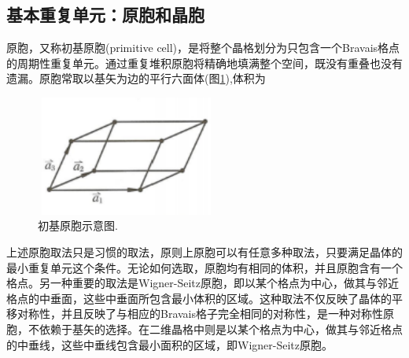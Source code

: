 \subsection{基本重复单元：原胞和晶胞}
原胞，又称初基原胞(primitive cell)，是将整个晶格划分为只包含一个Bravais格点的周期性重复单元。通过重复堆积原胞将精确地填满整个空间，既没有重叠也没有遗漏。原胞常取以基矢为边的平行六面体(图\ref{Fig:Primitive_Cell}),体积为
\begin{figure}[h!]
\centering
\vspace*{-0.05in}
\includegraphics[height=1.55in,width=2.35in,viewport=0 0 38 25,clip]{Figures/Primitive_cell.png}
\caption{\small \textrm{初基原胞示意图.}}%
\label{Fig:Primitive_Cell}
\end{figure}
上述原胞取法只是习惯的取法，原则上原胞可以有任意多种取法，只要满足晶体的最小重复单元这个条件。无论如何选取，原胞均有相同的体积，并且原胞含有一个格点。另一种重要的取法是Wigner-Seitz原胞，即以某个格点为中心，做其与邻近格点的中垂面，这些中垂面所包含最小体积的区域。这种取法{\heiti 不仅反映了晶体的平移对称性，并且反映了与相应的Bravais格子完全相同的对称性，是一种对称性原胞，不依赖于基矢的选择。}在二维晶格中则是以某个格点为中心，做其与邻近格点的中垂线，这些中垂线包含最小面积的区域，即Wigner-Seitz原胞。

